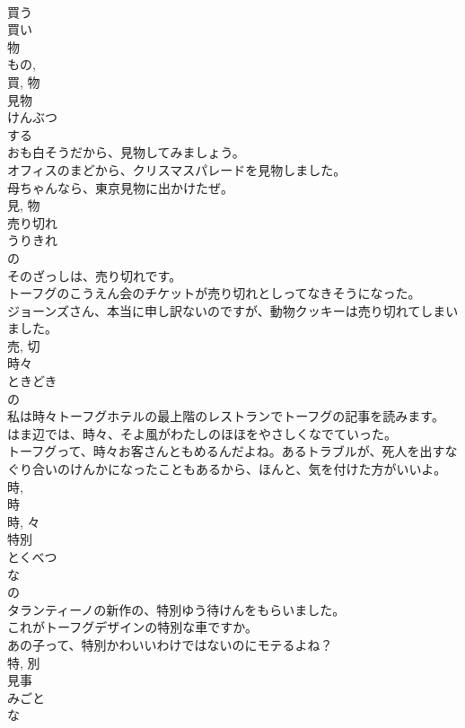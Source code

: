 \documentclass[8pt]{extreport}
\begin{document}
\begin{CJK}{UTF8}{min}
\\	買う 
\\	買い 
\\	物 
\\	もの, 
\\	買, 物	
\\	見物	
\\	けんぶつ	
\\	する 
\\	おも白そうだから、見物してみましょう。	
\\	オフィスのまどから、クリスマスパレードを見物しました。	
\\	母ちゃんなら、東京見物に出かけたぜ。	
\\	見, 物	
\\	売り切れ	
\\	うりきれ	
\\	の 
\\	そのざっしは、売り切れです。	
\\	トーフグのこうえん会のチケットが売り切れとしってなきそうになった。	
\\	ジョーンズさん、本当に申し訳ないのですが、動物クッキーは売り切れてしまいました。	
\\	売, 切	
\\	時々	
\\	ときどき	
\\	の 
\\	私は時々トーフグホテルの最上階のレストランでトーフグの記事を読みます。	
\\	はま辺では、時々、そよ風がわたしのほほをやさしくなでていった。	
\\	トーフグって、時々お客さんともめるんだよね。あるトラブルが、死人を出すなぐり合いのけんかになったこともあるから、ほんと、気を付けた方がいいよ。	
\\	時, 
\\	時 
\\	時, 々	
\\	特別	
\\	とくべつ	
\\	な 
\\	の 
\\	タランティーノの新作の、特別ゆう待けんをもらいました。	
\\	これがトーフグデザインの特別な車ですか。	
\\	あの子って、特別かわいいわけではないのにモテるよね？	
\\	特, 別	
\\	見事	
\\	みごと	
\\	な 

\end{CJK}
\end{document}
